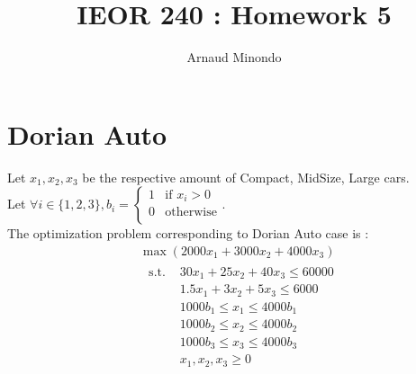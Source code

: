\documentclass{article}
\title{IEOR 240 : Homework 5}
\author{Arnaud Minondo}
\begin{document}
\maketitle
\section*{Dorian Auto}
Let $x_1,x_2,x_3$ be the respective amount of Compact, MidSize, Large cars.\\Let $\forall i \in\{1,2,3\}, b_i = \left\{\begin{array}{cc}
    1 & \text{if } x_i>0\\
    0 & \text{otherwise}\\
\end{array}\right.$.\\
The optimization problem corresponding to Dorian Auto case is :
\begin{equation}
    \boxed{
        \begin{split}
            &\max(2000x_1+3000x_2+4000x_3) \\
            &\begin{split}
                \text{ s.t. } & 30x_1+25x_2+40x_3\leq 60 000\\
                &1.5x_1+3x_2+5x_3 \leq 6000\\
                &1000b_1\leq x_1\leq 4000b_1 \\
                &1000b_2\leq x_2\leq 4000b_2\\
                &1000b_3\leq x_3\leq 4000b_3\\
                &x_1,x_2,x_3\ge 0\\
            \end{split}\\
        \end{split}}
\end{equation}\\\\
\end{document}
